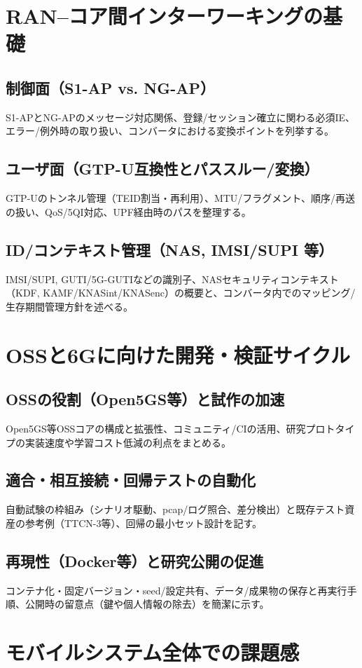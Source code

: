 \section{RAN–コア間インターワーキングの基礎}
\subsection{制御面（S1-AP vs. NG-AP）}
S1-APとNG-APのメッセージ対応関係、登録/セッション確立に関わる必須IE、エラー/例外時の取り扱い、コンバータにおける変換ポイントを列挙する。
\subsection{ユーザ面（GTP-U互換性とパススルー/変換）}
GTP-Uのトンネル管理（TEID割当・再利用）、MTU/フラグメント、順序/再送の扱い、QoS/5QI対応、UPF経由時のパスを整理する。
\subsection{ID/コンテキスト管理（NAS, IMSI/SUPI 等）}
IMSI/SUPI, GUTI/5G-GUTIなどの識別子、NASセキュリティコンテキスト（KDF, KAMF/KNASint/KNASenc）の概要と、コンバータ内でのマッピング/生存期間管理方針を述べる。

\section{OSSと6Gに向けた開発・検証サイクル}
\subsection{OSSの役割（Open5GS等）と試作の加速}
Open5GS等OSSコアの構成と拡張性、コミュニティ/CIの活用、研究プロトタイプの実装速度や学習コスト低減の利点をまとめる。
\subsection{適合・相互接続・回帰テストの自動化}
自動試験の枠組み（シナリオ駆動、pcap/ログ照合、差分検出）と既存テスト資産の参考例（TTCN-3等）、回帰の最小セット設計を記す。
\subsection{再現性（Docker等）と研究公開の促進}
コンテナ化・固定バージョン・seed/設定共有、データ/成果物の保存と再実行手順、公開時の留意点（鍵や個人情報の除去）を簡潔に示す。

\section{モバイルシステム全体での課題感}
